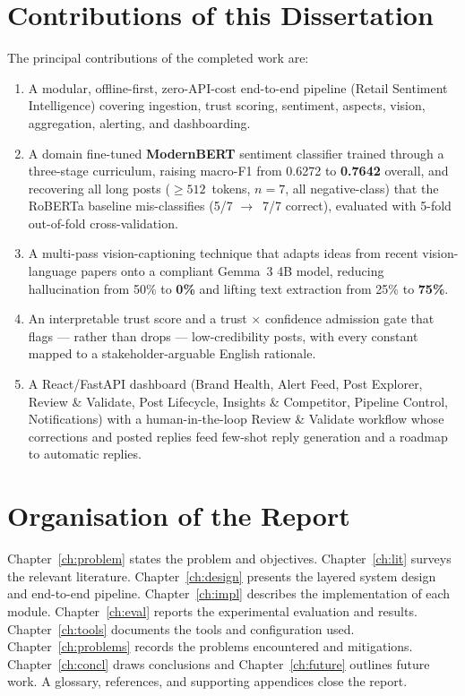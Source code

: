 \section{Contributions of this Dissertation}\label{sec:contrib}
The principal contributions of the completed work are:
\begin{enumerate}
\item A modular, offline-first, zero-API-cost end-to-end pipeline (Retail
Sentiment Intelligence) covering ingestion, trust scoring, sentiment,
aspects, vision, aggregation, alerting, and dashboarding.
\item A domain fine-tuned \textbf{ModernBERT} sentiment classifier trained
through a three-stage curriculum, raising macro-F1 from 0.6272 to
\textbf{0.7642} overall, and recovering all long posts ($\ge 512$~tokens,
$n{=}7$, all negative-class) that the RoBERTa baseline mis-classifies (5/7
$\to$~7/7 correct), evaluated with 5-fold out-of-fold cross-validation.
\item A multi-pass vision-captioning technique that adapts ideas from recent
vision-language papers onto a compliant Gemma~3 4B model, reducing
hallucination from 50\% to \textbf{0\%} and lifting text extraction from 25\%
to \textbf{75\%}.
\item An interpretable trust score and a \textsf{trust $\times$ confidence}
admission gate that flags --- rather than drops --- low-credibility posts,
with every constant mapped to a stakeholder-arguable English rationale.
\item A React/FastAPI dashboard (Brand Health, Alert Feed, Post Explorer,
Review \& Validate, Post Lifecycle, Insights \& Competitor, Pipeline
Control, Notifications) with a human-in-the-loop Review \& Validate workflow
whose corrections and posted replies feed few-shot reply generation and a
roadmap to automatic replies.
\end{enumerate}

\section{Organisation of the Report}\label{sec:org}
Chapter~\ref{ch:problem} states the problem and objectives.
Chapter~\ref{ch:lit} surveys the relevant literature.
Chapter~\ref{ch:design} presents the layered system design and end-to-end
pipeline.  Chapter~\ref{ch:impl} describes the implementation of each module.
Chapter~\ref{ch:eval} reports the experimental evaluation and results.
Chapter~\ref{ch:tools} documents the tools and configuration used.
Chapter~\ref{ch:problems} records the problems encountered and mitigations.
Chapter~\ref{ch:concl} draws conclusions and Chapter~\ref{ch:future} outlines
future work.  A glossary, references, and supporting appendices close the
report.
